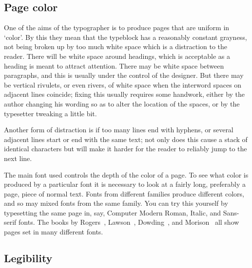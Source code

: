 \documentclass[10pt,a4paper,oneside,extrafontsizes]{memoir}%
\begin{document}


\subsection{Page color}

\begin{paracol}{2}
\switchEng
    One of the aims of the typographer is to produce pages that are uniform
in `color'. By this they mean that the 
typeblock has a reasonably constant
grayness, not being broken up by too much white space which is a distraction
to the reader. There will be white space around headings, 
which is acceptable as a heading is meant to attract attention. 
There may be white space between paragraphs, and this is 
usually under the control of the designer. But there 
may be vertical rivulets, or even rivers, of white space when the 
interword spaces on adjacent lines coincide; fixing this usually 
requires some handwork, either
by the author changing his wording so as to alter the location of
the spaces, or by the typesetter tweaking a little bit. 

    Another form of distraction is if too many lines end with hyphens, or
several adjacent lines start or end with the same text; not only does
this cause a stack of identical characters but will make it harder for 
the reader to reliably jump to the next line.

    The main font used controls the depth of the color of a page. To
see what color is produced by a particular font it is necessary to look
at a fairly long, preferably a page, piece of normal text. Fonts from
different families produce different colors, and so may mixed fonts from 
the same family. You can try this yourself by typesetting the same page
in, say, Computer Modern Roman, Italic, and Sans-serif fonts.
The books by Rogers~\autocite{ROGERS43}, Lawson~\autocite{LAWSON90},
Dowding~\autocite{DOWDING98}, and 
Morison~\autocite{MORISON99} all show pages set in many different fonts.
\end{paracol}
    

\subsection{Legibility}
\end{document}
